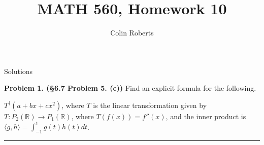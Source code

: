 \documentclass[leqno]{article}
\author{Colin Roberts}
\title{MATH 560, Homework 10}
\theoremstyle{nonumberplain}
\newcommand{\R}{\mathbb{R}}
\begin{document}
\maketitle
\begin{large}
\begin{center}
Solutions
\end{center}
\end{large}
\pagebreak

\noindent\textbf{Problem 1. (\S 6.7 Problem 5. (c))} Find an explicit formula for the following.

$T^\dagger(a+bx+cx^2)$, where $T$ is the linear transformation given by $T\colon P_2(\R)\to P_1(\R)$, where $T(f(x))=f''(x)$, and the inner product is $\langle g,h \rangle =\int_{-1}^1 g(t)h(t)dt$.

\noindent\rule[0.5ex]{\linewidth}{1pt}
\end{document}
